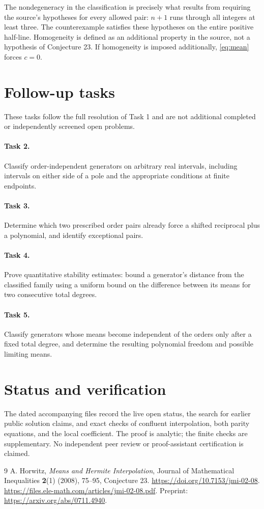 \documentclass[11pt]{article}
\begin{document}
The nondegeneracy in the classification is precisely what results from
requiring the source's hypotheses for every allowed pair: $n+1$ runs
through all integers at least three. The counterexample satisfies these
hypotheses on the entire positive half-line. Homogeneity is defined as
an additional property in the source, not a hypothesis of Conjecture 23.
If homogeneity is imposed additionally, \eqref{eq:mean} forces $c=0$.

\section*{Follow-up tasks}
These tasks follow the full resolution of Task 1 and are not additional
completed or independently screened open problems.
\paragraph{Task 2.} Classify order-independent generators on arbitrary real intervals,
including intervals on either side of a pole and the appropriate
conditions at finite endpoints.
\paragraph{Task 3.} Determine which two prescribed order pairs already force a shifted
reciprocal plus a polynomial, and identify exceptional pairs.
\paragraph{Task 4.} Prove quantitative stability estimates: bound a generator's distance
from the classified family using a uniform bound on the difference
between its means for two consecutive total degrees.
\paragraph{Task 5.} Classify generators whose means become independent of the orders
only after a fixed total degree, and determine the resulting polynomial
freedom and possible limiting means.

\section*{Status and verification}
The dated accompanying files record the live open status, the search for
earlier public solution claims, and exact checks of confluent interpolation,
both parity equations, and the local coefficient. The proof is analytic;
the finite checks are supplementary. No independent peer review or
proof-assistant certification is claimed.

\begin{thebibliography}{9}
 A. Horwitz, \emph{Means and Hermite Interpolation},
Journal of Mathematical Inequalities \textbf{2}(1) (2008), 75--95,
Conjecture 23. \url{https://doi.org/10.7153/jmi-02-08}.
\url{https://files.ele-math.com/articles/jmi-02-08.pdf}.
Preprint: \url{https://arxiv.org/abs/0711.4940}.
\end{thebibliography}
\end{document}
